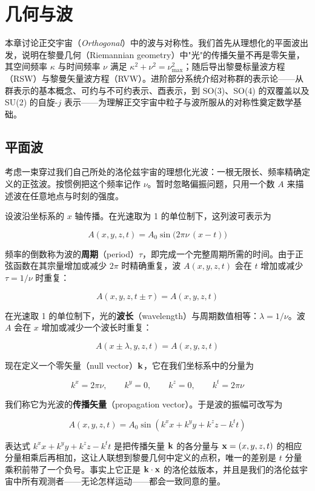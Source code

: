 \chapter{几何与波}

\providecommand{\tr}{\operatorname{tr}}
\providecommand{\by}{\mathbf{y}}
\providecommand{\bb}{\mathbf{b}}

本章讨论正交宇宙（\emph{Orthogonal}）中的波与对称性。我们首先从理想化的平面波出发，说明在黎曼几何（Riemannian geometry）中"光"的传播矢量不再是零矢量，其空间频率 $\kappa$ 与时间频率 $\nu$ 满足 $\kappa^{2}+\nu^{2}=\nu_{\max}^{2}$；随后导出黎曼标量波方程（RSW）与黎曼矢量波方程（RVW）。进阶部分系统介绍对称群的表示论——从群表示的基本概念、可约与不可约表示、酉表示，到 SO(3)、SO(4) 的双覆盖以及 SU(2) 的自旋-$j$ 表示——为理解正交宇宙中粒子与波所服从的对称性奠定数学基础。

\section{平面波}

考虑一束穿过我们自己所处的洛伦兹宇宙的理想化光波：一根无限长、频率精确定义的正弦波。按惯例把这个频率记作 $\nu$。暂时忽略偏振问题，只用一个数 $A$ 来描述波在任意地点与时刻的强度。

设波沿坐标系的 $x$ 轴传播。在光速取为 1 的单位制下，这列波可表示为

\[
A(x,y,z,t)=A_{0}\sin\!\bigl(2\pi\nu\,(x-t)\bigr)
\]


频率的倒数称为波的\textbf{周期}（period）$\tau$，即完成一个完整周期所需的时间。由于正弦函数在其宗量增加或减少 $2\pi$ 时精确重复，波 $A(x,y,z,t)$ 会在 $t$ 增加或减少 $\tau=1/\nu$ 时重复：

\[
A(x,y,z,t\pm\tau)=A(x,y,z,t)
\]

在光速取 1 的单位制下，光的\textbf{波长}（wavelength）与周期数值相等：$\lambda=1/\nu$。波 $A$ 会在 $x$ 增加或减少一个波长时重复：

\[
A(x\pm\lambda,y,z,t)=A(x,y,z,t)
\]

现在定义一个零矢量（null vector）$\mathbf{k}$，它在我们坐标系中的分量为

\[
k^{x}=2\pi\nu,\qquad k^{y}=0,\qquad k^{z}=0,\qquad k^{t}=2\pi\nu
\]

我们称它为光波的\textbf{传播矢量}（propagation vector）。于是波的振幅可改写为

\[
A(x,y,z,t)=A_{0}\sin(k^{x}x+k^{y}y+k^{z}z-k^{t}t)
\]

表达式 $k^{x}x+k^{y}y+k^{z}z-k^{t}t$ 是把传播矢量 $\mathbf{k}$ 的各分量与 $\mathbf{x}=(x,y,z,t)$ 的相应分量相乘后再相加，这让人联想到黎曼几何中定义的点积，唯一的差别是 $t$ 分量乘积前带了一个负号。事实上它正是 $\mathbf{k}\cdot\mathbf{x}$ 的洛伦兹版本，并且是我们的洛伦兹宇宙中所有观测者——无论怎样运动——都会一致同意的量。

